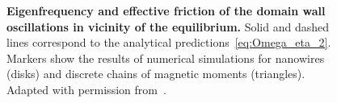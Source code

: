 \begin{figure}
	\caption{\textbf{Eigenfrequency and effective friction of the domain wall oscillations in vicinity of the equilibrium.} Solid and dashed lines correspond to the analytical predictions~\eqref{eq:Omega_eta_2}. Markers show the results of numerical simulations for nanowires (disks) and discrete chains of magnetic moments (triangles). 
	Adapted with permission from~\cite{Yershov15b}.}
	\label{fig:DW_dynamics_parabola}
\end{figure}


